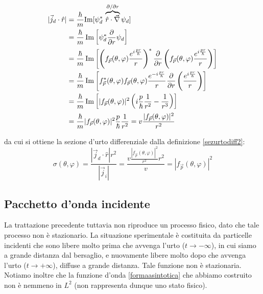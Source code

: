 \documentclass[../../FisicaTeorica.tex]{subfiles}
\begin{document}
\begin{align}
  | \vec{j}_d \cdot \hat{r} | & = \frac{\hbar}{m} \text{Im} [\psi_d^{\ast}
  \hspace{0.17em} \overbrace{\hat{r} \cdot \vec{\nabla}}^{\partial / \partial
  r} \psi_d] \notag \\
  & = \frac{\hbar}{m} \hspace{0.17em} \mathrm{Im} \left[ \psi_d^{\ast} 
  \frac{\partial}{\partial r} \psi_d \right] \notag \\
  & = \frac{\hbar}{m} \hspace{0.17em} \mathrm{Im} \left[ \left( f_{\vec{p}}
  (\theta, \varphi) \frac{e^{i \frac{pr}{\hbar}}}{r} \right)^{\ast} 
  \frac{\partial}{\partial r}  \left( f_{\vec{p}} (\theta, \varphi) \frac{e^{i
  \frac{pr}{\hbar}}}{r} \right) \right] \notag \\
  & = \frac{\hbar}{m} \hspace{0.17em} \mathrm{Im} \left[ f_{\vec{p}}^{\ast}
  (\theta, \varphi) f_{\vec{p}} (\theta, \varphi) \frac{e^{- i
  \frac{pr}{\hbar}}}{r}^{}  \frac{\partial}{\partial r}  \left( \frac{e^{i
  \frac{pr}{\hbar}}}{r} \right) \right] \notag \\
  & = \frac{\hbar}{m} \hspace{0.17em} \mathrm{Im} \left[ | f_{\vec{p}}
  (\theta, \varphi) |^2 \left( i \frac{p}{\hbar}  \frac{1}{r^2} -
  \frac{1}{r^3} \right) \right] \notag \\
  & = \frac{\hbar}{m}  | f_{\vec{p}} (\theta, \varphi) |^2  \frac{p}{\hbar} 
  \frac{1}{r^2} = v \frac{| f_{\vec{p}} (\theta, \varphi) |^2}{r^2} \notag
\end{align}

da cui si ottiene la sezione d'urto differenziale dalla definizione
{\eqref{sezurtodiff2}}:
\begin{equation}
  \label{sezurto1} \sigma (\theta, \varphi) = \frac{| \vec{j}_d \cdot \hat{r}
  | r^2}{| \vec{j}_i |} = \frac{v \frac{| f_{\vec{p}} (\theta, \varphi)
  |^2}{r^2} r^2}{v} = | f_{\vec{p}} (\theta, \varphi) |^2
\end{equation}


\subsection{Pacchetto d'onda incidente}

La trattazione precedente tuttavia non riproduce un processo fisico, dato che tale 
processo non {\`e} stazionario.
La situazione sperimentale {\`e}
costituita da particelle incidenti che sono libere molto prima che avvenga
l'urto ($t \to - \infty$), in cui siamo a grande distanza dal bersaglio, e
nuovamente libere molto dopo che avvenga l'urto ($t \to + \infty$), diffuse a
grande distanza. Tale funzione non {\`e} stazionaria. Notiamo inoltre che la
funzione d'onda \eqref{formaasintotica} che abbiamo costruito non {\`e} nemmeno in
$L^2$ (non rappresenta dunque uno stato fisico).
\end{document}
